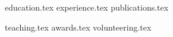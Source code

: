 \documentclass[letterpaper,11pt]{article}
\begin{document}


{education.tex}
{experience.tex}
{publications.tex}

\pagebreak

{teaching.tex}
{awards.tex}
{volunteering.tex}
\end{document}

